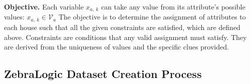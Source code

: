 \textbf{Objective.}
Each variable $x_{a,\ k}$ can take any value from its attribute's possible values:
$x_{a,\ k} \in \mathcal{V}_{a} $
The objective is to determine the assignment of attributes to each house such that all the given constraints are satisfied, which are defined above.
Constraints are conditions that any valid assignment must satisfy. They are derived from the uniqueness of values and the specific clues provided.




\subsection{ZebraLogic Dataset Creation Process} 
\label{ssec:dataset_creation}


    

